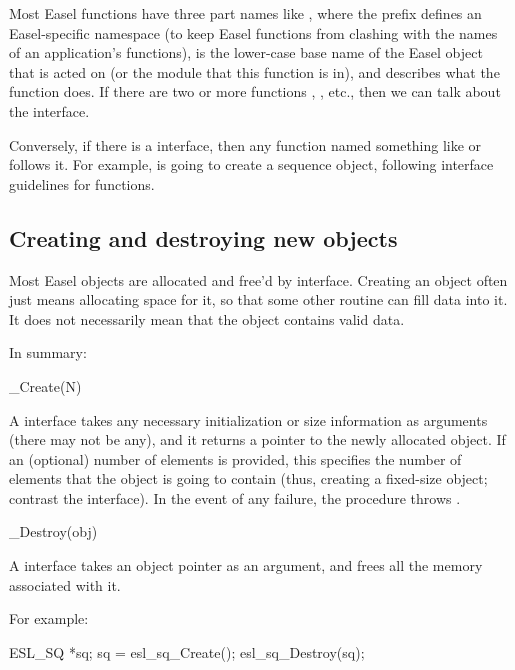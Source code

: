 Most Easel functions have three part names like
, where the  prefix defines an
Easel-specific namespace (to keep Easel functions from clashing with
the names of an application's functions),  is the
lower-case base name of the Easel object that is acted on (or the
module that this function is in), and  describes what
the function does.  If there are two or more functions
, , etc., then we
can talk about the  interface. 

Conversely, if there is a  interface, then any
function named something like  or
 follows it. For example,
 is going to create a 
sequence object, following interface guidelines for 
functions.

\subsection{Creating and destroying new objects}

Most Easel objects are allocated and free'd by
 interface. Creating an object often
just means allocating space for it, so that some other routine can
fill data into it. It does not necessarily mean that the object
contains valid data.

In summary:

\begin{sreapi}
\hypertarget{ifc:Create} 
{\item[\_Create(N)]}

A  interface takes any necessary initialization or
size information as arguments (there may not be any), and it returns a
pointer to the newly allocated object. If an (optional) number of
elements  is provided, this specifies the number of elements
that the object is going to contain (thus, creating a fixed-size
object; contrast the  interface).  In the
event of any failure, the procedure throws .

\hypertarget{ifc:Destroy} 
{\item[\_Destroy(obj)]}
A  interface takes an object pointer as an
argument, and frees all the memory associated with it.
\end{sreapi}

For example:
\begin{cchunk}
   ESL_SQ *sq;
   sq = esl_sq_Create();
   esl_sq_Destroy(sq);
\end{cchunk}



